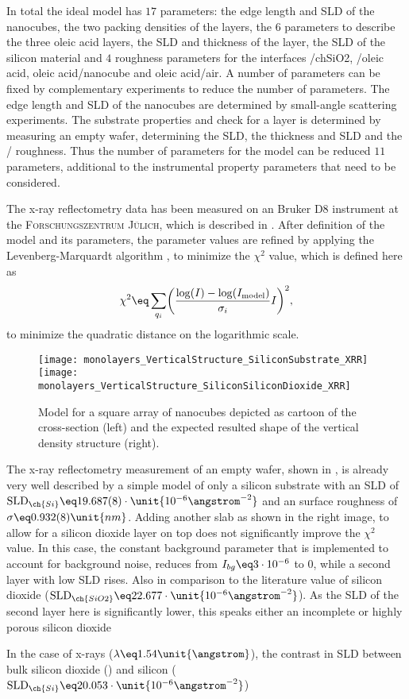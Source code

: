 \documentclass[\main/dresen_thesis.tex]{subfiles}
\begin{document}
  In total the ideal model has $17$ parameters: the edge length and SLD of the nanocubes, the two packing densities of the layers, the $6$ parameters to describe the three oleic acid layers, the SLD and thickness of the  layer, the SLD of the silicon material and $4$ roughness parameters for the interfaces /ch{SiO2}, /oleic acid, oleic acid/nanocube and oleic acid/air.
  A number of parameters can be fixed by complementary experiments to reduce the number of parameters.
  The edge length and SLD of the nanocubes are determined by small-angle scattering experiments.
  The substrate properties and check for a  layer is determined by measuring an empty wafer, determining the  SLD, the  thickness and SLD and the / roughness.
  Thus the number of parameters for the model can be reduced $11$ parameters, additional to the instrumental property parameters that need to be considered.

  The x-ray reflectometry data has been measured on an Bruker D8 instrument at the \textsc{Forschungszentrum J\"ulich}, which is described in .
  After definition of the model and its parameters, the parameter values are refined by applying the Levenberg-Marquardt algorithm %
  , to minimize the $\chi^2$ value, which is defined here as
  \begin{align}
    \chi^2 \eq \sum_{q_i} \biggl( \frac{\log(I) - \log(I_\mathrm{model})}{\sigma_i} I\biggr)^2,
  \end{align}
  to minimize the quadratic distance on the logarithmic scale.

  \begin{figure}[tb]
    \centering
    \texttt{[image: monolayers\_VerticalStructure\_SiliconSubstrate\_XRR]}
    \texttt{[image: monolayers\_VerticalStructure\_SiliconSiliconDioxide\_XRR]}
    \caption{\label{fig:monolayers:structure:emptySiliconWafer}Model for a square array of nanocubes depicted as cartoon of the cross-section (left) and the expected resulted shape of the vertical density structure (right).}
  \end{figure}
  The x-ray reflectometry measurement of an empty wafer, shown in , is already very well described by a simple model of only a silicon substrate with an SLD of $\mathrm{SLD}_{\ch{Si}} \eq 19.687(8) \cdot \unit{10^{-6} \angstrom^{-2}}$ and an surface roughness of $\sigma \eq 0.932(8)\unit{nm}$.%
  Adding another slab as shown in the right image, to allow for a silicon dioxide layer on top does not significantly improve the $\chi^2$ value.
  In this case, the constant background parameter that is implemented to account for background noise, reduces from $I_{bg} \eq 3 \cdot 10^{-6}$ to $0$, while a second layer with low SLD rises.
  Also in comparison to the literature value of silicon dioxide ($\mathrm{SLD}_{\ch{SiO2}} \eq 22.677  \cdot \unit{10^{-6} \angstrom^{-2}}$).
  As the SLD of the second layer here is significantly lower, this speaks either an incomplete or highly porous silicon dioxide

  In the case of x-rays ($\lambda \eq 1.54 \unit{\angstrom}$), the contrast in SLD between bulk silicon dioxide () and silicon ($\mathrm{SLD}_{\ch{Si}} \eq 20.053 \cdot \unit{10^{-6} \angstrom^{-2}}$) 
\end{document}
